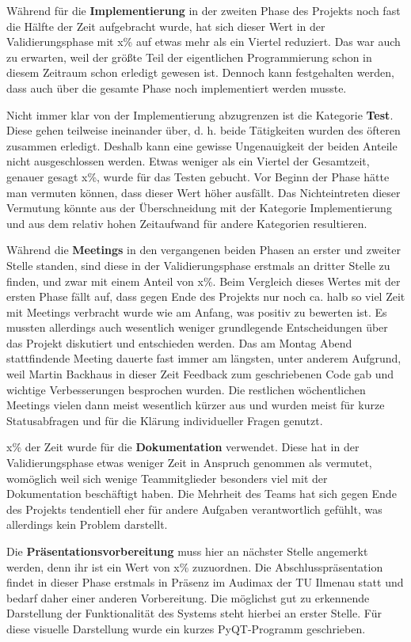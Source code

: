 \documentclass[../review_3.tex]{subfiles}
\begin{document}
Während für die \textbf{Implementierung} in der zweiten Phase des Projekts noch fast die Hälfte der Zeit aufgebracht wurde, hat sich dieser Wert in der Validierungsphase mit x\% auf etwas mehr als ein Viertel reduziert. Das war auch zu erwarten, weil der größte Teil der eigentlichen Programmierung schon in diesem Zeitraum schon erledigt gewesen ist. Dennoch kann festgehalten werden, dass auch über die gesamte Phase noch implementiert werden musste.

Nicht immer klar von der Implementierung abzugrenzen ist die Kategorie \textbf{Test}. Diese gehen teilweise ineinander über, d. h. beide Tätigkeiten wurden des öfteren zusammen erledigt. Deshalb kann eine gewisse Ungenauigkeit der beiden Anteile nicht ausgeschlossen werden. Etwas weniger als ein Viertel der Gesamtzeit, genauer gesagt x\%, wurde für das Testen gebucht. Vor Beginn der Phase hätte man vermuten können, dass dieser Wert höher ausfällt. Das Nichteintreten dieser Vermutung könnte aus der Überschneidung mit der Kategorie Implementierung und aus dem relativ hohen Zeitaufwand für andere Kategorien resultieren.

Während die \textbf{Meetings} in den vergangenen beiden Phasen an erster und zweiter Stelle standen, sind diese in der Validierungsphase erstmals an dritter Stelle zu finden, und zwar mit einem Anteil von x\%. Beim Vergleich dieses Wertes mit der ersten Phase fällt auf, dass gegen Ende des Projekts nur noch ca. halb so viel Zeit mit Meetings verbracht wurde wie am Anfang, was positiv zu bewerten ist. Es mussten allerdings auch wesentlich weniger grundlegende Entscheidungen über das Projekt diskutiert und entschieden werden. Das am Montag Abend stattfindende Meeting dauerte fast immer am längsten, unter anderem Aufgrund, weil Martin Backhaus in dieser Zeit Feedback zum geschriebenen Code gab und wichtige Verbesserungen besprochen wurden. Die restlichen wöchentlichen Meetings vielen dann meist wesentlich kürzer aus und wurden meist für kurze Statusabfragen und für die Klärung individueller Fragen genutzt.

x\% der Zeit wurde für die \textbf{Dokumentation} verwendet. Diese hat in der Validierungsphase etwas weniger Zeit in Anspruch genommen als vermutet, womöglich weil sich wenige Teammitglieder besonders viel mit der Dokumentation beschäftigt haben. Die Mehrheit des Teams hat sich gegen Ende des Projekts tendentiell eher für andere Aufgaben verantwortlich gefühlt, was allerdings kein Problem darstellt.

Die \textbf{Präsentationsvorbereitung} muss hier an nächster Stelle angemerkt werden, denn ihr ist ein Wert von x\% zuzuordnen. Die Abschlusspräsentation findet in dieser Phase erstmals in Präsenz im Audimax der TU Ilmenau statt und bedarf daher einer anderen Vorbereitung. Die möglichst gut zu erkennende Darstellung der Funktionalität des Systems steht hierbei an erster Stelle. Für diese visuelle Darstellung wurde ein kurzes PyQT-Programm geschrieben.
\end{document}
